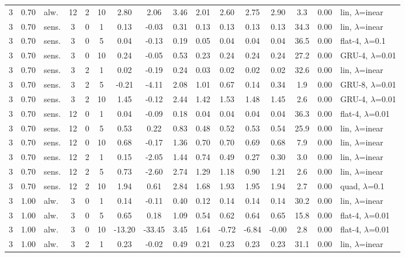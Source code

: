 \documentclass[10pt]{article}
\begin{document}
\begin{scriptsize}
\begin{longtable}{cclcc c ccc ccc c cc l}
3 & 0.70 & alw. & 12 & 2 & 10 & 2.80 & 2.06 & 3.46 & 2.01 & 2.60 & 2.75 & 2.90 & 3.3 & 0.00 & lin, $\lambda$=inear \\
3 & 0.70 & sens. & 3 & 0 & 1 & 0.13 & -0.03 & 0.31 & 0.13 & 0.13 & 0.13 & 0.13 & 34.3 & 0.00 & lin, $\lambda$=inear \\
3 & 0.70 & sens. & 3 & 0 & 5 & 0.04 & -0.13 & 0.19 & 0.05 & 0.04 & 0.04 & 0.04 & 36.5 & 0.00 & flat-4, $\lambda$=0.1 \\
3 & 0.70 & sens. & 3 & 0 & 10 & 0.24 & -0.05 & 0.53 & 0.23 & 0.24 & 0.24 & 0.24 & 27.2 & 0.00 & GRU-4, $\lambda$=0.01 \\
3 & 0.70 & sens. & 3 & 2 & 1 & 0.02 & -0.19 & 0.24 & 0.03 & 0.02 & 0.02 & 0.02 & 32.6 & 0.00 & lin, $\lambda$=inear \\
3 & 0.70 & sens. & 3 & 2 & 5 & -0.21 & -4.11 & 2.08 & 1.01 & 0.67 & 0.14 & 0.34 & 1.9 & 0.00 & GRU-8, $\lambda$=0.01 \\
3 & 0.70 & sens. & 3 & 2 & 10 & 1.45 & -0.12 & 2.44 & 1.42 & 1.53 & 1.48 & 1.45 & 2.6 & 0.00 & GRU-4, $\lambda$=0.01 \\
3 & 0.70 & sens. & 12 & 0 & 1 & 0.04 & -0.09 & 0.18 & 0.04 & 0.04 & 0.04 & 0.04 & 36.3 & 0.00 & flat-4, $\lambda$=0.01 \\
3 & 0.70 & sens. & 12 & 0 & 5 & 0.53 & 0.22 & 0.83 & 0.48 & 0.52 & 0.53 & 0.54 & 25.9 & 0.00 & lin, $\lambda$=inear \\
3 & 0.70 & sens. & 12 & 0 & 10 & 0.68 & -0.17 & 1.36 & 0.70 & 0.70 & 0.69 & 0.68 & 7.9 & 0.00 & lin, $\lambda$=inear \\
3 & 0.70 & sens. & 12 & 2 & 1 & 0.15 & -2.05 & 1.44 & 0.74 & 0.49 & 0.27 & 0.30 & 3.0 & 0.00 & lin, $\lambda$=inear \\
3 & 0.70 & sens. & 12 & 2 & 5 & 0.73 & -2.60 & 2.74 & 1.29 & 1.18 & 0.90 & 1.21 & 2.6 & 0.00 & lin, $\lambda$=inear \\
3 & 0.70 & sens. & 12 & 2 & 10 & 1.94 & 0.61 & 2.84 & 1.68 & 1.93 & 1.95 & 1.94 & 2.7 & 0.00 & quad, $\lambda$=0.1 \\
3 & 1.00 & alw. & 3 & 0 & 1 & 0.14 & -0.11 & 0.40 & 0.12 & 0.14 & 0.14 & 0.14 & 30.2 & 0.00 & lin, $\lambda$=inear \\
3 & 1.00 & alw. & 3 & 0 & 5 & 0.65 & 0.18 & 1.09 & 0.54 & 0.62 & 0.64 & 0.65 & 15.8 & 0.00 & flat-4, $\lambda$=0.01 \\
3 & 1.00 & alw. & 3 & 0 & 10 & -13.20 & -33.45 & 3.45 & 1.64 & -0.72 & -6.84 & -0.00 & 2.8 & 0.00 & flat-4, $\lambda$=0.01 \\
3 & 1.00 & alw. & 3 & 2 & 1 & 0.23 & -0.02 & 0.49 & 0.21 & 0.23 & 0.23 & 0.23 & 31.1 & 0.00 & lin, $\lambda$=inear \\

\end{longtable}
\end{scriptsize}
\end{document}
